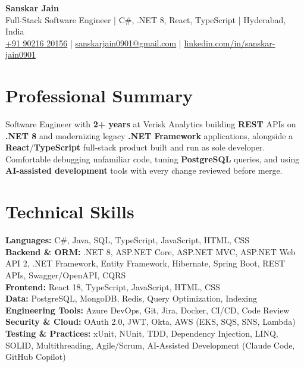 \documentclass[a4paper,10pt]{article}
\begin{document}
\begin{center}
    {\LARGE \textbf{Sanskar Jain}} \\
    \vspace{2pt}
    Full-Stack Software Engineer \;|\; C\#, .NET 8, React, TypeScript \;|\; Hyderabad, India \\
    \href{tel:+919021620156}{+91 90216 20156} \;|\;
    \href{mailto:sanskarjain0901@gmail.com}{sanskarjain0901@gmail.com} \;|\;
    \href{https://www.linkedin.com/in/sanskar-jain0901/}{linkedin.com/in/sanskar-jain0901}
\end{center}

\section*{Professional Summary}
Software Engineer with \textbf{2+ years} at Verisk Analytics building \textbf{REST} APIs on \textbf{.NET 8} and modernizing legacy \textbf{.NET Framework} applications, alongside a \textbf{React}/\textbf{TypeScript} full-stack product built and run as sole developer. Comfortable debugging unfamiliar code, tuning \textbf{PostgreSQL} queries, and using \textbf{AI-assisted development} tools with every change reviewed before merge.

\section*{Technical Skills}
\begin{sloppypar}
\noindent
\textbf{Languages:} C\#, Java, SQL, TypeScript, JavaScript, HTML, CSS \\
\textbf{Backend \& ORM:} .NET 8, ASP.NET Core, ASP.NET MVC, ASP.NET Web API 2, .NET Framework, Entity Framework, Hibernate, Spring Boot, REST APIs, Swagger/OpenAPI, CQRS \\
\textbf{Frontend:} React 18, TypeScript, JavaScript, HTML, CSS \\
\textbf{Data:} PostgreSQL, MongoDB, Redis, Query Optimization, Indexing \\
\textbf{Engineering Tools:} Azure DevOps, Git, Jira, Docker, CI/CD, Code Review \\
\textbf{Security \& Cloud:} OAuth 2.0, JWT, Okta, AWS (EKS, SQS, SNS, Lambda) \\
\textbf{Testing \& Practices:} xUnit, NUnit, TDD, Dependency Injection, LINQ, SOLID, Multithreading, Agile/Scrum, AI-Assisted Development (Claude Code, GitHub Copilot)
\end{sloppypar}
\end{document}
